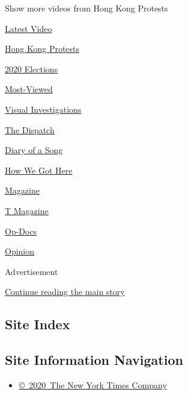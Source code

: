 Show more videos from Hong Kong Protests

\href{/video}{}

\href{/video/latest-video}{Latest Video}

\href{/video/hk-protest}{Hong Kong Protests}

\href{/video/2020-Elections}{2020 Elections}

\href{/video/Most-Viewed}{Most-Viewed}

\href{/video/investigations}{Visual Investigations}

\href{/video/on-the-ground}{The Dispatch}

\href{/video/diaryofasong}{Diary of a Song}

\href{/video/how-we-got-here}{How We Got Here}

\href{/video/magazine}{Magazine}

\href{/video/t-magazine}{T Magazine}

\href{/video/op-docs}{Op-Docs}

\href{/video/opinion}{Opinion}

Advertisement

\protect\hyperlink{after-bottom}{Continue reading the main story}

\hypertarget{site-index}{%
\subsection{Site Index}\label{site-index}}

\hypertarget{site-information-navigation}{%
\subsection{Site Information
Navigation}\label{site-information-navigation}}

\begin{itemize}
\tightlist
\item
  \href{https://help.nytimes.com/hc/en-us/articles/115014792127-Copyright-notice}{©~2020~The
  New York Times Company}
\end{itemize}


